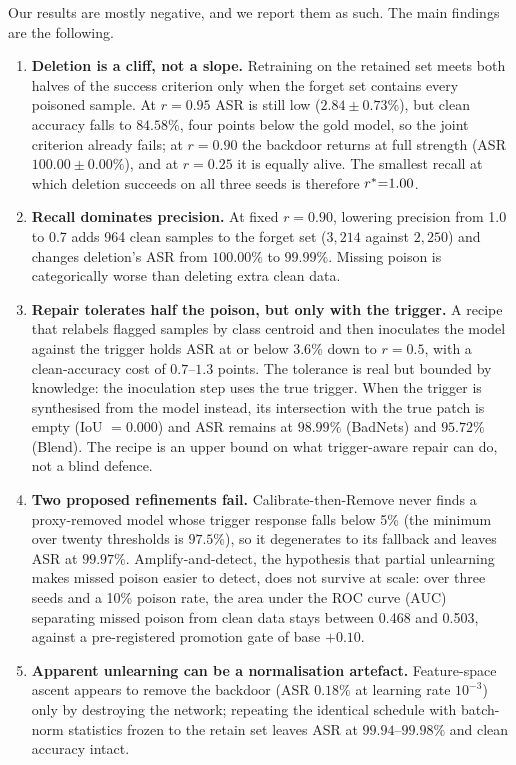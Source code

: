 Our results are mostly negative, and we report them as such. The main findings
are the following.

\begin{enumerate}
\item \textbf{Deletion is a cliff, not a slope.} Retraining on the retained set
meets both halves of the success criterion only when the forget set contains
every poisoned sample. At $r{=}0.95$ ASR is still low ($2.84\pm0.73\%$), but
clean accuracy falls to $84.58\%$, four points below the gold model, so the
joint criterion already fails; at $r{=}0.90$ the backdoor returns at full
strength (ASR $100.00\pm0.00\%$), and at $r{=}0.25$ it is equally alive. The
smallest recall at which deletion succeeds on all three seeds is therefore
$r^{\ast}{=}1.00$.

\item \textbf{Recall dominates precision.} At fixed $r{=}0.90$, lowering
precision from 1.0 to 0.7 adds 964 clean samples to the forget set ($3{,}214$
against $2{,}250$) and changes deletion's ASR from $100.00\%$ to $99.99\%$.
Missing poison is categorically worse than deleting extra clean data.

\item \textbf{Repair tolerates half the poison, but only with the trigger.} A
recipe that relabels flagged samples by class centroid and then inoculates the
model against the trigger holds ASR at or below $3.6\%$ down to $r{=}0.5$, with
a clean-accuracy cost of $0.7$--$1.3$ points. The tolerance is real but bounded by
knowledge: the inoculation step uses the true trigger. When the trigger is
synthesised from the model instead, its intersection with the true patch is
empty (IoU $=0.000$) and ASR remains at $98.99\%$ (BadNets) and $95.72\%$
(Blend). The recipe is an upper bound on what trigger-aware repair can do, not a
blind defence.

\item \textbf{Two proposed refinements fail.} Calibrate-then-Remove never finds
a proxy-removed model whose trigger response falls below 5\% (the minimum over
twenty thresholds is $97.5\%$), so it degenerates to its fallback and leaves ASR
at $99.97\%$. Amplify-and-detect, the hypothesis that partial unlearning makes
missed poison easier to detect, does not survive at scale: over three seeds and
a 10\% poison rate, the area under the ROC curve (AUC) separating missed poison
from clean data stays between 0.468 and 0.503, against a pre-registered
promotion gate of base $+0.10$.

\item \textbf{Apparent unlearning can be a normalisation artefact.} Feature-space
ascent appears to remove the backdoor (ASR $0.18\%$ at learning rate $10^{-3}$)
only by destroying the network; repeating the identical schedule with batch-norm
statistics frozen to the retain set leaves ASR at $99.94$--$99.98\%$ and clean
accuracy intact.


\end{enumerate}
